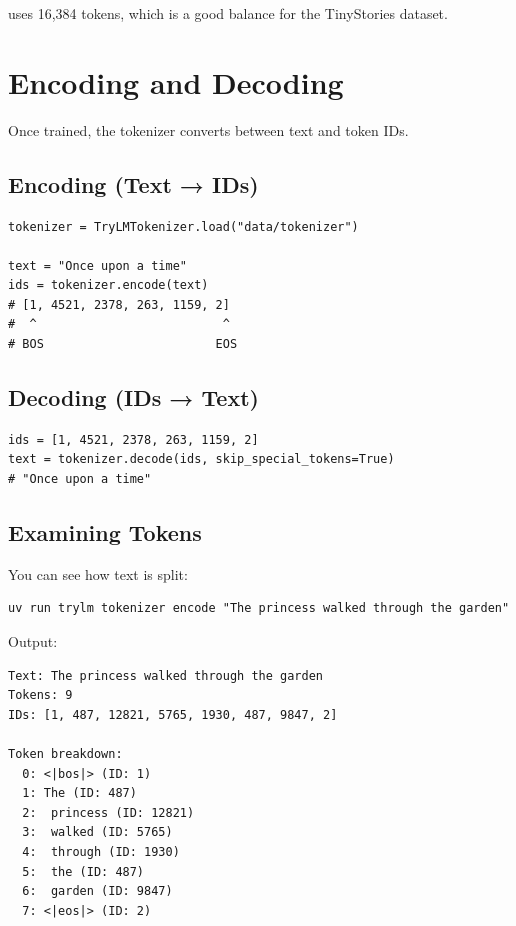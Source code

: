 \TryLM uses 16,384 tokens, which is a good balance for the TinyStories dataset.

\section{Encoding and Decoding}

Once trained, the tokenizer converts between text and token IDs.

\subsection{Encoding (Text → IDs)}

\begin{lstlisting}[style=python]
tokenizer = TryLMTokenizer.load("data/tokenizer")

text = "Once upon a time"
ids = tokenizer.encode(text)
# [1, 4521, 2378, 263, 1159, 2]
#  ^                          ^
# BOS                        EOS
\end{lstlisting}

\subsection{Decoding (IDs → Text)}

\begin{lstlisting}[style=python]
ids = [1, 4521, 2378, 263, 1159, 2]
text = tokenizer.decode(ids, skip_special_tokens=True)
# "Once upon a time"
\end{lstlisting}

\subsection{Examining Tokens}

You can see how text is split:

\begin{lstlisting}[style=shell]
uv run trylm tokenizer encode "The princess walked through the garden"
\end{lstlisting}

Output:
\begin{lstlisting}[style=shell, numbers=none]
Text: The princess walked through the garden
Tokens: 9
IDs: [1, 487, 12821, 5765, 1930, 487, 9847, 2]

Token breakdown:
  0: <|bos|> (ID: 1)
  1: The (ID: 487)
  2:  princess (ID: 12821)
  3:  walked (ID: 5765)
  4:  through (ID: 1930)
  5:  the (ID: 487)
  6:  garden (ID: 9847)
  7: <|eos|> (ID: 2)
\end{lstlisting}

